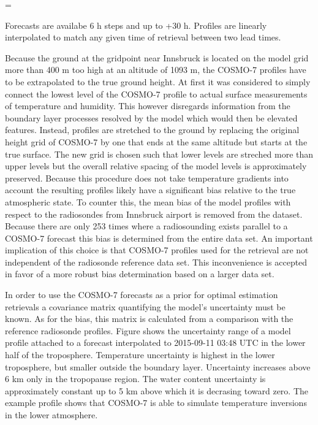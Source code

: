     \startformula
        \QLIQ = \QCLOUD \startcases
              \, \KELVIN \le \TEMP \NR
            \NC {}
                 \, \KELVIN \lt \TEMP {} \, \KELVIN \EQSTOP \NR
              \, \KELVIN \le \TEMP \NR
        \stopcases
    \stopformula

    Forecasts are availabe 6 h steps and up to +30 h. Profiles are linearly
    interpolated to match any given time of retrieval between two lead times.

    Because the ground at the gridpoint near Innsbruck is located on the model
    grid more than 400 m too high at an altitude of 1093 m, the COSMO-7
    profiles have to be extrapolated to the true ground height. At first it was
    considered to simply connect the lowest level of the COSMO-7 profile to
    actual surface measurements of temperature and humidity. This however
    disregards information from the boundary layer processes resolved by the
    model which would then be elevated features. Instead, profiles are
    stretched to the ground by replacing the original height grid of COSMO-7
    by one that ends at the same altitude but starts at the true surface.
    The new grid is chosen such that lower levels are streched more than
    upper levels but the overall relative spacing of the model levels is
    approximately preserved. Because this procedure does not take temperature
    gradients into account the resulting profiles likely have a significant
    bias relative to the true atmospheric state. To counter this, the mean
    bias of the model profiles with respect to the radiosondes from Innsbruck
    airport is removed from the dataset. Because there are only 253 times
    where a radiosounding exists parallel to a COSMO-7 forecast this bias is
    determined from the entire data set. An important implication of this
    choice is that COSMO-7 profiles used for the retrieval are not independent
    of the radiosonde reference data set. This inconvenience is accepted in
    favor of a more robust bias determination based on a larger data set.

    In order to use the COSMO-7 forecasts as a prior for optimal estimation
    retrievals a covariance matrix quantifying the model's uncertainty must
    be known. As for the bias, this matrix is calculated from a comparison
    with the reference radiosonde profiles. Figure 
    shows the uncertainty range of a model profile attached to a forecast
    interpolated to 2015-09-11 03:48 UTC in the lower half of the troposphere.
    Temperature uncertainty is highest in the lower troposphere, but smaller
    outside the boundary layer. Uncertainty increases above 6 km only in the
    tropopause region. The water content uncertainty is approximately constant
    up to 5 km above which it is decrasing toward zero. The example profile
    shows that COSMO-7 is able to simulate temperature inversions in the lower
    atmosphere.

